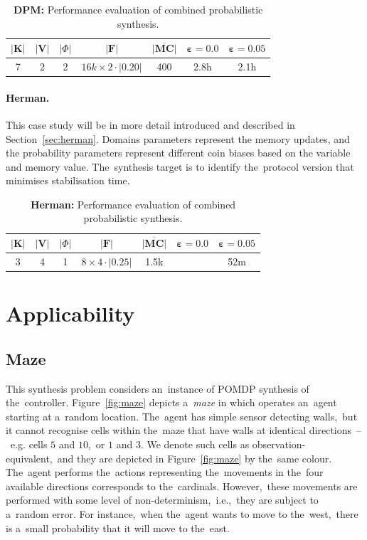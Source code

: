 \begin{table}[h!]
\centering
\begin{tabular}{|c|c|c|c|c|c|c|}
\hline
$\lvert \mathbf{K} \rvert$ & $\lvert \mathbf{V} \rvert$ & $\lvert \varPhi \rvert$ & $\lvert \mathcal{\mathbf{F}} \rvert$ & $\overline{\mathbf{\lvert MC \rvert}}$ & $\mathbf{\varepsilon = 0.0}$ & $\mathbf{\varepsilon = 0.05}$ \\ \hline
7 & 2 & 2 & $16k \times 2 \cdot \lvert 0.20 \rvert$ & 400 & 2.8h & 2.1h \\ \hline
\end{tabular}
\caption{\textbf{DPM:} Performance evaluation of combined probabilistic synthesis.}
\end{table}

\paragraph{Herman.}
This case study will be in more detail introduced and described in Section~\ref{sec:herman}.
Domains parameters represent the memory updates, and the probability parameters represent different coin biases based on the variable and memory value.
The~synthesis target is to identify the~protocol version that minimises stabilisation time.

\begin{table}[h!]
\centering
\begin{tabular}{|c|c|c|c|c|c|c|}
\hline
$\lvert \mathbf{K} \rvert$ & $\lvert \mathbf{V} \rvert$ & $\lvert \varPhi \rvert$ & $\lvert \mathcal{\mathbf{F}} \rvert$ & $\overline{\mathbf{\lvert MC \rvert}}$ & $\mathbf{\varepsilon = 0.0}$ & $\mathbf{\varepsilon = 0.05}$ \\ \hline
3 & 4 & 1 & $8 \times 4 \cdot \lvert 0.25 \rvert$ & 1.5k & \todo{?} & 52m \\ \hline
\end{tabular}
\caption{\textbf{Herman:} Performance evaluation of combined probabilistic synthesis.}
\end{table}

\section{Applicability}

\subsection{Maze} 
This synthesis problem considers an~instance of POMDP synthesis of the~controller.
Figure~\ref{fig:maze} depicts a~\emph{maze} in which operates an~agent starting at a~random location.
The~agent has simple sensor detecting walls,~but it cannot recognise cells within the~maze that have walls at identical directions \,--\,~e.g. cells $5$ and $10$,~or $1$ and $3$.
We denote such cells as observation-equivalent,~and they are depicted in Figure~\ref{fig:maze} by the~same colour.
The~agent performs the~actions representing the~movements in the~four available directions corresponds to the~cardinals.
However,~these movements are performed with some level of non-determinism,~i.e.,~they are subject to a~random error.
For instance,~when the~agent wants to move to the~west,~there is a~small probability that it will move to the~east.


